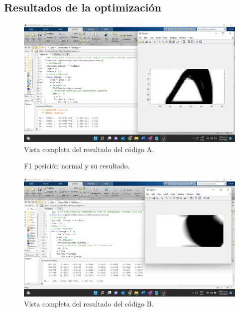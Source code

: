 \documentclass{article}
\begin{document}
\subsection{Resultados de la optimización}
\begin{figure}[htp] %
    \centering
    \includegraphics[width=150mm]{oar.jpeg} %
    \caption{Vista completa del resultado del código A.}
    \label{grafica}
\end{figure}
\begin{figure}[htp]
  \centering
  \hfill
  \caption{F1 posición normal y su resultado.}
\end{figure}
\newpage
\begin{figure}[htp] %
    \centering
    \includegraphics[width=150mm]{obr.jpeg} %
    \caption{Vista completa del resultado del código B.}
    \label{grafica}
\end{figure}
\end{document}
